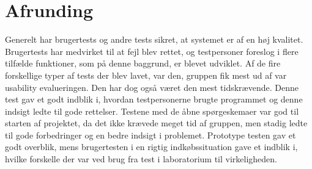 \section{Afrunding}
Generelt har brugertests og andre tests sikret, at systemet er af en høj kvalitet. Brugertests har medvirket til at fejl blev rettet, og testpersoner foreslog i flere tilfælde funktioner, som på denne baggrund, er blevet udviklet. Af de fire forskellige typer af tests der blev lavet, var den, gruppen fik mest ud af var usability evalueringen. Den har dog også været den mest tidskrævende. Denne test gav et godt indblik i, hvordan testpersonerne brugte programmet og denne indsigt ledte til gode rettelser. Testene med de åbne spørgeskemaer var god til starten af projektet, da det ikke krævede meget tid af gruppen, men stadig ledte til gode forbedringer og en bedre indsigt i problemet. Prototype testen gav et godt overblik, mens brugertesten i en rigtig indkøbssituation gave et indblik i, hvilke forskelle der var ved brug fra test i laboratorium til virkeligheden.